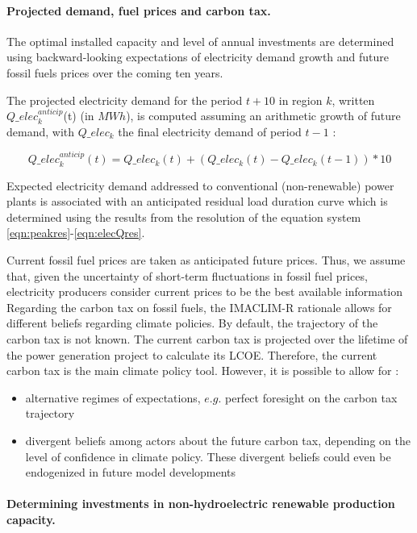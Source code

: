 \paragraph{Projected demand, fuel prices and carbon tax.}

The optimal installed capacity and level of annual investments are determined using backward-looking expectations of electricity demand growth and  future fossil fuels prices over the coming ten years.

The projected electricity demand for the period $t+10$ in region $k$, written $Q\_elec_k^{anticip}$(t) (in $MWh$), is computed assuming an arithmetic growth of future demand, with $Q\_elec_k$  the final electricity demand of period $t-1$ : 

\begin{dmath}
    Q\_elec_k^{anticip}(t) = Q\_elec_k(t) + (Q\_elec_k(t) - Q\_elec_k(t-1))*10
    \label{eqn:elecQAnticip}
\end{dmath}

Expected electricity demand addressed to conventional (non-renewable) power plants is associated with an anticipated residual load duration curve which is determined using the results from the resolution of the equation system \ref{eqn:peakres}-\ref{eqn:elecQres}.

Current fossil fuel prices are taken as anticipated future prices. Thus, we assume that, given the uncertainty of short-term fluctuations in fossil fuel prices, electricity producers consider current prices to be the best available information 
Regarding the carbon tax on fossil fuels, the IMACLIM-R rationale allows for different beliefs regarding climate policies. By default, the trajectory of the carbon tax is not known. The current carbon tax is projected over the lifetime of the power generation project to calculate its LCOE. Therefore, the current carbon tax is the main climate policy tool. However, it is possible to allow for :
\begin{itemize}
    \item alternative regimes of expectations, $e.g.$ perfect foresight on the carbon tax trajectory
    \item divergent beliefs among actors about the future carbon tax, depending on the level of confidence in climate policy. These divergent beliefs could even be endogenized in future model developments
\end{itemize} 

\paragraph{Determining investments in non-hydroelectric renewable production capacity.}

